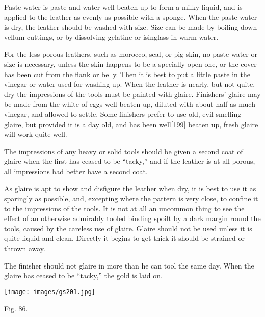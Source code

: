 \documentclass[
]{article}
\begin{document}
Paste-water is paste and water well beaten up to form a milky liquid,
and is applied to the leather as evenly as possible with a sponge. When
the paste-water is dry, the leather should be washed with size. Size can
be made by boiling down vellum cuttings, or by dissolving gelatine or
isinglass in warm water.

For the less porous leathers, such as morocco, seal, or pig skin, no
paste-water or size is necessary, unless the skin happens to be a
specially open one, or the cover has been cut from the flank or belly.
Then it is best to put a little paste in the vinegar or water used for
washing up. When the leather is nearly, but not quite, dry the
impressions of the tools must be painted with glaire. Finishers' glaire
may be made from the white of eggs well beaten up, diluted with about
half as much vinegar, and allowed to settle. Some finishers prefer to
use old, evil-smelling glaire, but provided it is a day old, and has
been well{\protect\hypertarget{Page_199}{}{{[}199{]}}} beaten up, fresh
glaire will work quite well.

The impressions of any heavy or solid tools should be given a second
coat of glaire when the first has ceased to be ``tacky,'' and if the
leather is at all porous, all impressions had better have a second coat.

As glaire is apt to show and disfigure the leather when dry, it is best
to use it as sparingly as possible, and, excepting where the pattern is
very close, to confine it to the impressions of the tools. It is not at
all an uncommon thing to see the effect of an otherwise admirably tooled
binding spoilt by a dark margin round the tools, caused by the careless
use of glaire. Glaire should not be used unless it is quite liquid and
clean. Directly it begins to get thick it should be strained or thrown
away.

The finisher should not glaire in more than he can tool the same day.
When the glaire has ceased to be ``tacky,'' the gold is laid on.

\protect\hypertarget{Fig_86}{}{}
\texttt{[image: images/gs201.jpg]}

Fig. 86.
\end{document}
